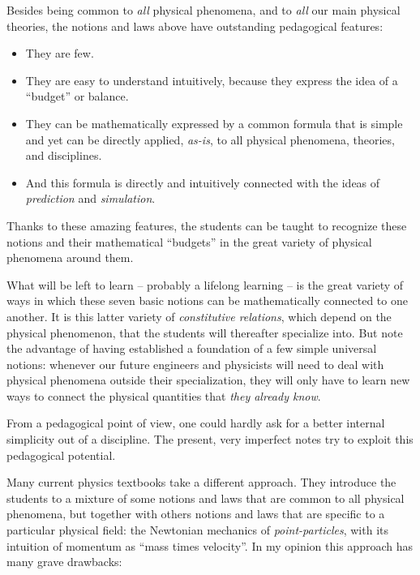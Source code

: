 \documentclass[a4paper,12pt,%
onecolumn,oneside,%
british%
]{memoir}
\renewcommand*{\|}[1][]{\nonscript\:#1\vert\nonscript\:\mathopen{}}
\begin{document}
\medskip

Besides being common to \emph{all} physical phenomena, and to \emph{all} our main physical theories, the notions and laws above have outstanding pedagogical features:
\begin{itemize}
\item They are few.
\item They are easy to understand intuitively, because they express the idea of a \enquote{budget} or balance.
\item They can be mathematically expressed by a common formula that is simple and yet can be directly applied, \emph{as-is}, to all physical phenomena, theories, and disciplines.
\item And this formula is directly and intuitively connected with the ideas of \emph{prediction} and \emph{simulation}.
\end{itemize}
Thanks to these amazing features, the students can be taught to recognize these notions and their mathematical \enquote{budgets} in the great variety of physical phenomena around them.

What will be left to learn -- probably a lifelong learning -- is the great variety of ways in which these seven basic notions can be mathematically connected to one another. It is this latter variety of \emph{constitutive relations}, which depend on the physical phenomenon, that the students will thereafter specialize into. But note the advantage of having established a foundation of a few simple universal notions: whenever our future engineers and physicists will need to deal with physical phenomena outside their specialization, they will only have to learn new ways to connect the physical quantities that \emph{they already know}.

From a pedagogical point of view, one could hardly ask for a better internal simplicity out of a discipline. The present, very imperfect notes try to exploit this pedagogical potential.

\bigskip

Many current physics textbooks take a different approach. They introduce the students to a mixture of some notions and laws that are common to all physical phenomena, but together with others notions and laws that are specific to a particular physical field: the Newtonian mechanics of \emph{point-particles}, with its intuition of momentum as \enquote{mass times velocity}. In my opinion this approach has many grave drawbacks:
\end{document}
